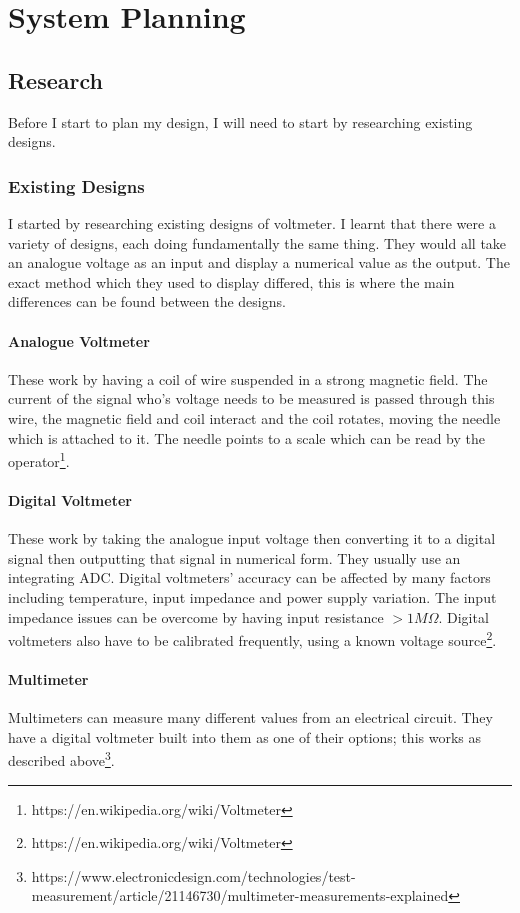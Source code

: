 \chapter{System Planning}
\section{Research}
Before I start to plan my design, I will need to start by researching existing designs.
\subsection{Existing Designs}
I started by researching existing designs of voltmeter. I learnt that there were a variety of designs, each doing fundamentally the same thing. They would all take an analogue voltage as an input and display a numerical value as the output. The exact method which they used to display differed, this is where the main differences can be found between the designs.
\subsubsection{Analogue Voltmeter}
These work by having a coil of wire suspended in a strong magnetic field. The current of the signal who's voltage needs to be measured is passed through this wire, the magnetic field and coil interact and the coil rotates, moving the needle which is attached to it. The needle points to a scale which can be read by the operator\footnote{https://en.wikipedia.org/wiki/Voltmeter}.

\subsubsection{Digital Voltmeter}
These work by taking the analogue input voltage then converting it to a digital signal then outputting that signal in numerical form. They usually use an integrating ADC. Digital voltmeters' accuracy can be affected by many factors including temperature, input impedance and power supply variation. The input impedance issues can be overcome by having input resistance $>1M\Omega $. Digital voltmeters also have to be calibrated frequently, using a known voltage source\footnote{https://en.wikipedia.org/wiki/Voltmeter}.

\subsubsection{Multimeter}
Multimeters can measure many different values from an electrical circuit. They have a digital voltmeter built into them as one of their options; this works as described above\footnote{https://www.electronicdesign.com/technologies/test-measurement/article/21146730/multimeter-measurements-explained}.

